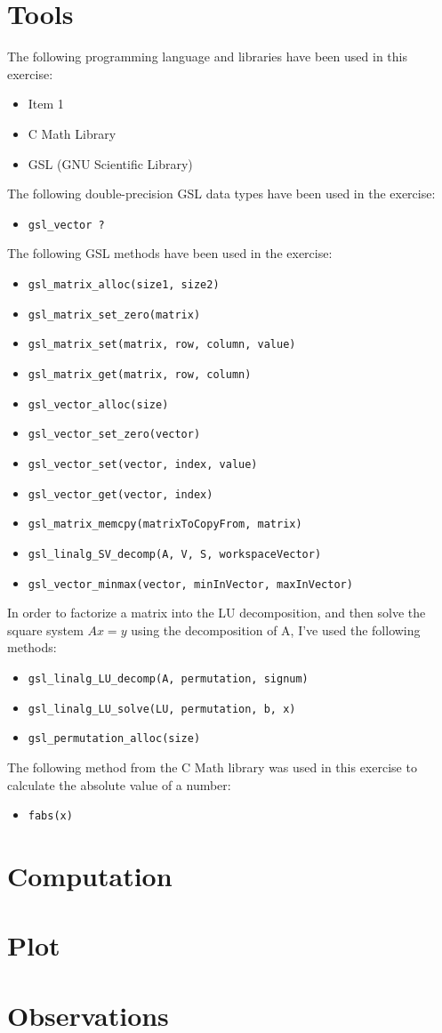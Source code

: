 \documentclass{article}
\newcommand{\code}{\texttt}
\begin{document}
\section{Tools}
The following programming language and libraries have been used in this exercise:
\begin{itemize}
  \item Item 1
  \item C Math Library
  \item GSL (GNU Scientific Library)
\end{itemize}
The following double-precision GSL data types have been used in the exercise:
\begin{itemize}
  \item \code{gsl\_vector ?}
\end{itemize}
The following GSL methods have been used in the exercise:
\begin{itemize}
  \item \code{gsl\_matrix\_alloc(size1, size2)}
  \item \code{gsl\_matrix\_set\_zero(matrix)}
  \item \code{gsl\_matrix\_set(matrix, row, column, value)}
  \item \code{gsl\_matrix\_get(matrix, row, column)}
  \item \code{gsl\_vector\_alloc(size)}
  \item \code{gsl\_vector\_set\_zero(vector)}
  \item \code{gsl\_vector\_set(vector, index, value)}
  \item \code{gsl\_vector\_get(vector, index)}
  \item \code{gsl\_matrix\_memcpy(matrixToCopyFrom, matrix)}
  \item \code{gsl\_linalg\_SV\_decomp(A, V, S, workspaceVector)}
  \item \code{gsl\_vector\_minmax(vector, minInVector, maxInVector)}
\end{itemize}
In order to factorize a matrix into the LU decomposition, and then solve the square system $Ax=y$ using the decomposition of A, I've used the following methods:
\begin{itemize}
  \item \code{gsl\_linalg\_LU\_decomp(A, permutation, signum)}
  \item \code{gsl\_linalg\_LU\_solve(LU, permutation, b, x)}
  \item \code{gsl\_permutation\_alloc(size)}
\end{itemize}
The following method from the C Math library was used in this exercise to calculate the absolute value of a number:
\begin{itemize}
  \item \code{fabs(x)}
\end{itemize}
  
\section{Computation}


\section{Plot}
\section{Observations}
\end{document}
